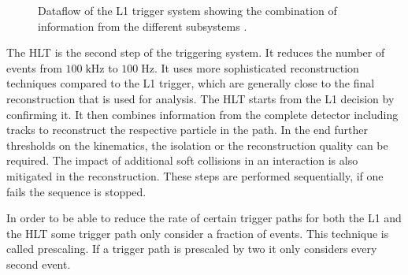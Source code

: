 \begin{figure}[htbp!]
  \begin{center}

\caption{ Dataflow of the L1 trigger system showing the combination of information from the different subsystems \cite{Tapper:2013yva}.
  \label{fig:det_Trigger}}
  \end{center}
\end{figure}

The HLT is the second step of the triggering system. It reduces the number of events from $100 \; \si{\kilo \hertz}$ to $100 \; \si{\hertz}$.
It uses more sophisticated reconstruction techniques compared to the L1 trigger, which are generally close to the final reconstruction that is used for analysis.
The HLT starts from the L1 decision by confirming it. It then combines information from the complete detector including tracks to reconstruct the respective particle in the path.
In the end further thresholds on the kinematics, the isolation or the reconstruction quality can be required. The impact of additional soft collisions in an interaction is also mitigated in the reconstruction.
These steps are performed sequentially, if one fails the sequence is stopped. 

In order to be able to reduce the rate of certain trigger paths for both the L1 and the HLT some trigger path only consider a fraction of events. This technique is called prescaling. If a trigger path is prescaled by two it only considers every second event.

